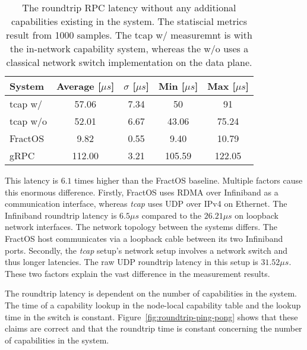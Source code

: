 \begin{table}[H]
  \centering
  \begin{tabular}{lcccc}
    \toprule
    System & Average [$\mu s$] & $\sigma$ [$\mu s$] & Min [$\mu s$] & Max [$\mu s$]\\
    \midrule
    tcap w/& 57.06&7.34&50 &91 \\
    tcap w/o & 52.01& 6.67 & 43.06 & 75.24\\
    FractOS & 9.82 & 0.55 &9.40 & 10.79 \\
    gRPC & 112.00 & 3.21 & 105.59& 122.05 \\
    \bottomrule
  \end{tabular}
  \vspace{1em}
  \caption{\label{table:roundtrip} The roundtrip \ac{RPC} latency without any additional capabilities existing in the system. The statiscial metrics result from 1000 samples. The tcap w/ measuremnt is with the in-network capability system, whereas the w/o uses a classical network switch implementation on the data plane.}
\end{table}

This latency is $6.1$ times higher than the FractOS baseline. Multiple factors cause this enormous difference. Firstly, FractOS uses \ac{RDMA} over Infiniband as a communication interface, whereas \emph{tcap} uses \ac{UDP} over \ac{IPv4} on Ethernet. The Infiniband roundtrip latency is $6.5 \mu{}s$ compared to the $26.21 \mu{}s$ on loopback network interfaces. The network topology between the systems differs. The FractOS host communicates via a loopback cable between its two Infiniband ports. Secondly, the \emph{tcap} setup's network setup involves a network switch and thus longer latencies. The raw \ac{UDP} roundtrip latency in this setup is $31.52\mu{}s$. These two factors explain the vast difference in the measurement results.

The roundtrip latency is dependent on the number of capabilities in the system. The time of a capability lookup in the node-local capability table and the lookup time in the switch is constant. Figure~\ref{fig:roundtrip-ping-pong} shows that these claims are correct and that the roundtrip time is constant concerning the number of capabilities in the system.

